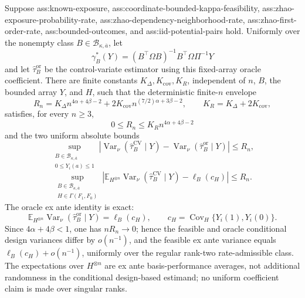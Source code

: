 Suppose ass:known-exposure, ass:coordinate-bounded-kappa-feasibility, ass:zhao-exposure-probability-rate, ass:zhao-dependency-neighborhood-rate, ass:zhao-first-order-rate, ass:bounded-outcomes, and ass:iid-potential-pairs hold.  Uniformly over the nonempty class \(B\in\mathcal B_{\kappa,\overline a}\), let
\[
\gamma_B^*(Y)=(B^{\top}\Omega B)^{-1}B^{\top}\Omega\Pi^{-1}Y
\]
and let \(\widehat\tau_B^{\mathrm{or}}\) be the control-variate estimator using this fixed-array oracle coefficient.  There are finite constants \(K_\Delta,K_{\mathrm{cov}},K_R\), independent of \(n\), \(B\), the bounded array \(Y\), and \(H\), such that the deterministic finite-\(n\) envelope
\[
R_n=K_\Delta n^{4\alpha+4\beta-2}
+2K_{\mathrm{cov}}n^{(7/2)\alpha+3\beta-2},
\qquad K_R=K_\Delta+2K_{\mathrm{cov}},
\]
satisfies, for every \(n\ge3\),
\[
0\le R_n\le K_Rn^{4\alpha+4\beta-2}
\]
and the two uniform absolute bounds
\[
\sup_{\substack{B\in\mathcal B_{\kappa,\overline a}\\0\le Y_i(a)\le1}}
\left|
\operatorname{Var}_\nu(\widehat\tau_B^{\mathrm{CV}}\mid Y)
-\operatorname{Var}_\nu(\widehat\tau_B^{\mathrm{or}}\mid Y)
\right|
\le R_n,
\]
\[
\sup_{\substack{B\in\mathcal B_{\kappa,\overline a}\\H\in\Gamma(F_1,F_0)}}
\left|
\mathbb E_{H^{\otimes n}}
\operatorname{Var}_\nu(\widehat\tau_B^{\mathrm{CV}}\mid Y)
-\ell_B(c_H)
\right|
\le R_n.
\]
The oracle ex ante identity is exact:
\[
\mathbb E_{H^{\otimes n}}
\operatorname{Var}_\nu(\widehat\tau_B^{\mathrm{or}}\mid Y)
=\ell_B(c_H),
\qquad
c_H=\operatorname{Cov}_H\{Y_i(1),Y_i(0)\}.
\]
Since \(4\alpha+4\beta<1\), one has \(nR_n\to0\); hence the feasible and oracle conditional design variances differ by \(o(n^{-1})\), and the feasible ex ante variance equals \(\ell_B(c_H)+o(n^{-1})\), uniformly over the regular rank-two rate-admissible class.  The expectations over \(H^{\otimes n}\) are ex ante basis-performance averages, not additional randomness in the conditional design-based estimand; no uniform coefficient claim is made over singular ranks.